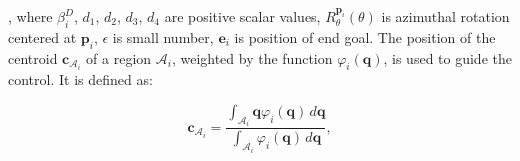         
        
        
        , where \(\beta_i^D\), \(d_1\), \(d_2\), \(d_3\), \(d_4\) are positive scalar values, \(R_{\theta}^{\mathbf{p}_i}(\theta)\) is azimuthal rotation centered at \(\mathbf{p}_i\),
        \(\epsilon\) is small number, \(\mathbf{e}_i\) is position of end goal.
        The position of the centroid \( \mathbf{c}_{\mathcal{A}_i} \) of a region \( \mathcal{A}_i \), weighted by the function \( \varphi_i(\mathbf{q}) \), is used to guide the control. 
        It is defined as:

        \begin{equation}
            \mathbf{c}_{\mathcal{A}_i} = \frac{\int_{\mathcal{A}_i} \mathbf{q} \varphi_i(\mathbf{q}) \, d\mathbf{q}}{\int_{\mathcal{A}_i} \varphi_i(\mathbf{q}) \, d\mathbf{q}},
        \end{equation}

